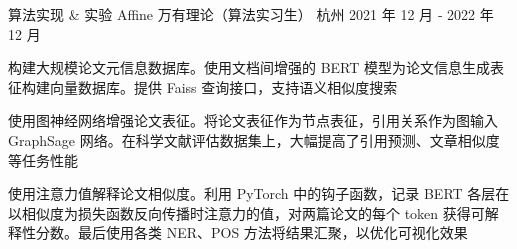 

\begin{cventries}

  \cventry
    {算法实现 \& 实验} %
    {Affine 万有理论（算法实习生）} %
    {杭州} %
    { 2021 年 12 月 ‑ 2022 年 12 月} %
    {
      \begin{cvitems} %
        \item {构建大规模论文元信息数据库。使用文档间增强的 BERT 模型为论文信息生成表征构建向量数据库。提供 Faiss 查询接口，支持语义相似度搜索}
        \item {使用图神经网络增强论文表征。将论文表征作为节点表征，引用关系作为图输入 GraphSage 网络。在科学文献评估数据集上，大幅提高了引用预测、文章相似度等任务性能}
        \item {使用注意力值解释论文相似度。利用 PyTorch 中的钩子函数，记录 BERT 各层在以相似度为损失函数反向传播时注意力的值，对两篇论文的每个 token 获得可解释性分数。最后使用各类 NER、POS 方法将结果汇聚，以优化可视化效果}
      \end{cvitems}
    }


\end{cventries}
